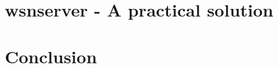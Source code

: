 \documentclass[bibtotocnumbered, headsepline,normalheadings]{report}
\begin{document}


\chapter{wsnserver - A practical solution}



\chapter{Conclusion}






\end{document}
